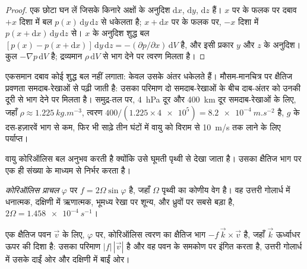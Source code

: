 \begin{proof}
एक छोटा घन लें जिसके किनारे अक्षों के अनुदिश $\mathrm dx$, $\mathrm dy$, $\mathrm dz$ हैं।
$x$ पर के फलक पर दबाव $+x$ दिशा में बल $p(x)\,\mathrm dy\,\mathrm dz$ से धकेलता है; $x + \mathrm dx$ पर के फलक पर, $-x$
दिशा में $p(x + \mathrm dx)\,\mathrm dy\,\mathrm dz$ से। $x$ के अनुदिश शुद्ध बल
$[p(x) - p(x + \mathrm dx)]\,\mathrm dy\,\mathrm dz = -(\partial p/\partial
x)\,\mathrm dV$ है, और इसी प्रकार $y$ और $z$ के अनुदिश। कुल $-\nabla p\,
\mathrm dV$ है; द्रव्यमान $\rho\,\mathrm dV$ से भाग देने पर त्वरण मिलता है।
\end{proof}

एकसमान दबाव कोई शुद्ध बल नहीं लगाता: केवल उसके अंतर धकेलते हैं। मौसम-मानचित्र पर क्षैतिज प्रवणता समदाब-रेखाओं से पढ़ी जाती है: उसका परिमाण दो समदाब-रेखाओं के बीच दाब-अंतर को उनकी दूरी से भाग देने पर मिलता है। समुद्र-तल पर, \qty{4}{hPa} दूर और \qty{400}{km} दूर समदाब-रेखाओं के लिए, जहाँ $\rho \approx \qty{1.225}{kg.m^{-3}}$, त्वरण $400/(1.225 \times \num{4e5}) = \qty{8.2e-4}{m.s^{-2}}$ है, $g$ के दस-हज़ारवें भाग से कम, फिर भी साढ़े तीन घंटों में वायु को विराम से \qty{10}{m/s} तक लाने के लिए पर्याप्त।

वायु कोरिऑलिस बल अनुभव करती है क्योंकि उसे घूमती पृथ्वी से देखा जाता है। उसका क्षैतिज भाग  पर एक ही संख्या के माध्यम से निर्भर करता है।

\begin{definition}[कोरिऑलिस प्राचल]\label{def:b1:atmospheric-circulation:coriolis-parameter}
\emph{कोरिऑलिस प्राचल}  $\varphi$ पर
$f = 2\Omega\sin\varphi$ है, जहाँ $\Omega$ पृथ्वी का कोणीय वेग है। वह उत्तरी गोलार्ध में धनात्मक, दक्षिणी में ऋणात्मक, भूमध्य रेखा पर शून्य, और ध्रुवों पर सबसे बड़ा है,
$2\Omega = \qty{1.458e-4}{s^{-1}}$।
\end{definition}

\begin{proposition}[क्षैतिज कोरिऑलिस त्वरण]\label{prop:b1:atmospheric-circulation:coriolis}
एक क्षैतिज पवन $\vec v$ के लिए,  $\varphi$ पर, कोरिऑलिस त्वरण का क्षैतिज भाग $-f\,\vec k\times\vec v$ है, जहाँ $\vec k$ ऊर्ध्वाधर ऊपर की दिशा है: उसका परिमाण $|f|\,|\vec v|$ है और वह पवन के समकोण पर इंगित करता है, उत्तरी गोलार्ध में उसके दाईं ओर और दक्षिणी में बाईं ओर।
\end{proposition}

